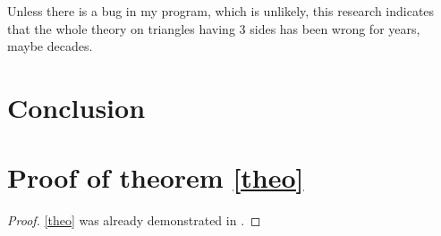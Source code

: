 \documentclass{thesisreport}
\begin{document}
Unless there is a bug in my program, which is unlikely, this research indicates that the whole theory on triangles having 3 sides has been wrong for years, maybe decades.
 

\newpage 
 
 \chapter*{Conclusion}
 
 
 \appendix	
 
 \chapter{Proof of theorem \ref{theo}}
 \label{sec:prooftheorem}
 
 
 \begin{proof}
\eqref{theo} was already demonstrated in \cite{euclides300}.
\end{proof}
 
 
 
 
 
 
 
\end{document}
